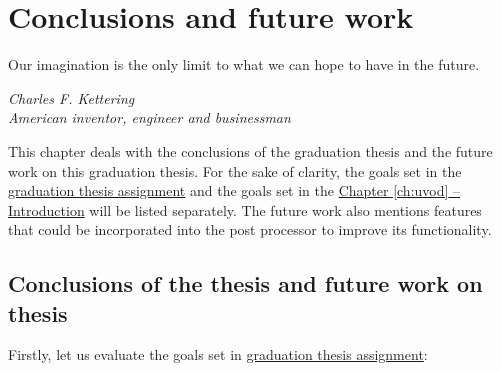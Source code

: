 ﻿\chapter{Conclusions and future work \label{chap:discussion}}

\epigraph{Our imagination is the only limit to what we can hope to have in the future.}{\textit{Charles F. Kettering \\ American inventor, engineer and businessman }}

This chapter deals with the conclusions of the graduation thesis and the future work on this graduation thesis. For the sake of clarity, the goals set in the \hyperref[task]{graduation thesis assignment}  and the goals set in the \hyperref[ch:uvod]{Chapter \ref{ch:uvod} -- Introduction} will be listed separately. The future work also mentions features that could be incorporated into the post processor to improve its functionality. 

\section{Conclusions of the thesis and future work on thesis}

Firstly, let us evaluate the goals set in  \hyperref[task]{graduation thesis assignment}:

